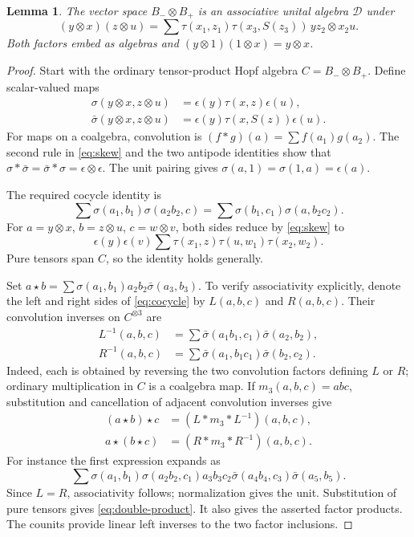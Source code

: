 \documentclass[11pt]{article}
\newtheorem{lemma}[theorem]{Lemma}
\theoremstyle{definition}
\theoremstyle{remark}
\newcommand{\cD}{\mathcal{D}}
\begin{document}
\begin{lemma}\label{lem:cocycle}
The vector space $B_-\otimes B_+$ is an associative unital algebra $\cD$ under
\begin{equation}\label{eq:double-product}
 (y\otimes x)(z\otimes u)
 =\sum\tau(x_1,z_1)\tau(x_3,S(z_3))\,yz_2\otimes x_2u.
\end{equation}
Both factors embed as algebras and $(y\otimes1)(1\otimes x)=y\otimes x$.
\end{lemma}
\begin{proof}
Start with the ordinary tensor-product Hopf algebra $C=B_-\otimes B_+$. Define scalar-valued maps
\[
 \begin{aligned}
 \sigma(y\otimes x,z\otimes u)&=\epsilon(y)\tau(x,z)\epsilon(u),\\
 \bar\sigma(y\otimes x,z\otimes u)&=\epsilon(y)\tau(x,S(z))\epsilon(u).
 \end{aligned}
\]
For maps on a coalgebra, convolution is $(f*g)(a)=\sum f(a_1)g(a_2)$. The second rule in \eqref{eq:skew} and the two antipode identities show that $\sigma*\bar\sigma=\bar\sigma*\sigma=\epsilon\otimes\epsilon$. The unit pairing gives $\sigma(a,1)=\sigma(1,a)=\epsilon(a)$.

The required cocycle identity is
\begin{equation}\label{eq:cocycle}
 \sum\sigma(a_1,b_1)\sigma(a_2b_2,c)
 =\sum\sigma(b_1,c_1)\sigma(a,b_2c_2).
\end{equation}
For $a=y\otimes x$, $b=z\otimes u$, $c=w\otimes v$, both sides reduce by \eqref{eq:skew} to
\[
 \epsilon(y)\epsilon(v)\sum\tau(x_1,z)\tau(u,w_1)\tau(x_2,w_2).
\]
Pure tensors span $C$, so the identity holds generally.

Set $a\star b=\sum\sigma(a_1,b_1)a_2b_2\bar\sigma(a_3,b_3)$. To verify associativity explicitly, denote the left and right sides of \eqref{eq:cocycle} by $L(a,b,c)$ and $R(a,b,c)$. Their convolution inverses on $C^{\otimes3}$ are
\[
 \begin{aligned}
 L^{-1}(a,b,c)&=\sum\bar\sigma(a_1b_1,c_1)\bar\sigma(a_2,b_2),\\
 R^{-1}(a,b,c)&=\sum\bar\sigma(a_1,b_1c_1)\bar\sigma(b_2,c_2).
 \end{aligned}
\]
Indeed, each is obtained by reversing the two convolution factors defining $L$ or $R$; ordinary multiplication in $C$ is a coalgebra map. If $m_3(a,b,c)=abc$, substitution and cancellation of adjacent convolution inverses give
\[
 \begin{aligned}
 (a\star b)\star c&=(L*m_3*L^{-1})(a,b,c),\\
 a\star(b\star c)&=(R*m_3*R^{-1})(a,b,c).
 \end{aligned}
\]
For instance the first expression expands as
\[
 \sum\sigma(a_1,b_1)\sigma(a_2b_2,c_1)
 a_3b_3c_2\bar\sigma(a_4b_4,c_3)\bar\sigma(a_5,b_5).
\]
Since $L=R$, associativity follows; normalization gives the unit. Substitution of pure tensors gives \eqref{eq:double-product}. It also gives the asserted factor products. The counits provide linear left inverses to the two factor inclusions.
\end{proof}
\end{document}
